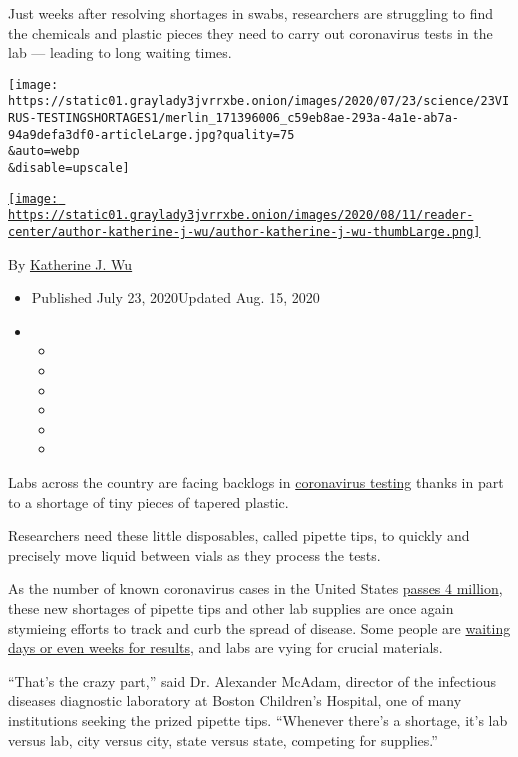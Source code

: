 Just weeks after resolving shortages in swabs, researchers are
struggling to find the chemicals and plastic pieces they need to carry
out coronavirus tests in the lab --- leading to long waiting times.

\texttt{[image: https://static01.graylady3jvrrxbe.onion/images/2020/07/23/science/23VIRUS-TESTINGSHORTAGES1/merlin\_171396006\_c59eb8ae-293a-4a1e-ab7a-94a9defa3df0-articleLarge.jpg?quality=75\\\&auto=webp\\\&disable=upscale]}

\href{https://www.nytimes3xbfgragh.onion/by/katherine-j--wu}{\texttt{[image: https://static01.graylady3jvrrxbe.onion/images/2020/08/11/reader-center/author-katherine-j-wu/author-katherine-j-wu-thumbLarge.png]}}

By
\href{https://www.nytimes3xbfgragh.onion/by/katherine-j--wu}{Katherine
J. Wu}

\begin{itemize}
\item
  Published July 23, 2020Updated Aug. 15, 2020
\item
  \begin{itemize}
  \item
  \item
  \item
  \item
  \item
  \item
  \end{itemize}
\end{itemize}

Labs across the country are facing backlogs in
\href{https://www.nytimes3xbfgragh.onion/2020/08/15/us/coronavirus-testing-decrease.html}{coronavirus
testing} thanks in part to a shortage of tiny pieces of tapered plastic.

Researchers need these little disposables, called pipette tips, to
quickly and precisely move liquid between vials as they process the
tests.

As the number of known coronavirus cases in the United States
\href{https://www.nytimes3xbfgragh.onion/interactive/2020/us/coronavirus-us-cases.html}{passes
4 million}, these new shortages of pipette tips and other lab supplies
are once again stymieing efforts to track and curb the spread of
disease. Some people are
\href{https://larremorelab.github.io/covid19testgroup}{waiting days or
even weeks for results}, and labs are vying for crucial materials.

``That's the crazy part,'' said Dr. Alexander McAdam, director of the
infectious diseases diagnostic laboratory at Boston Children's Hospital,
one of many institutions seeking the prized pipette tips. ``Whenever
there's a shortage, it's lab versus lab, city versus city, state versus
state, competing for supplies.''

